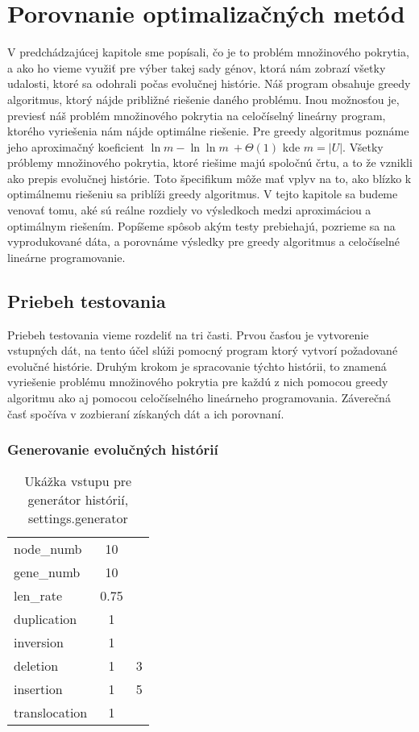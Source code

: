 \chapter{Porovnanie optimalizačných metód}
V predchádzajúcej kapitole sme popísali, čo je to problém množinového pokrytia, a
ako ho vieme využiť pre výber takej sady génov, ktorá nám zobrazí všetky udalosti, ktoré sa odohrali počas evolučnej histórie.
Náš program obsahuje greedy algoritmus, ktorý nájde približné riešenie daného problému.
Inou možnosťou je, previesť náš problém množinového pokrytia na celočíselný lineárny program, ktorého vyriešenia nám nájde optimálne riešenie.
Pre greedy algoritmus poznáme jeho aproximačný koeficient \(\ln m - \ln \ln m\ +\Theta(1) \) \cite{Slavik} 
kde \(m = |U|\). 
Všetky próblemy množinového pokrytia, ktoré riešime majú spoločnú črtu, a to že vznikli ako prepis evolučnej histórie.
Toto špecifikum môže mať vplyv na to, ako blízko k optimálnemu riešeniu sa priblíži greedy algoritmus.
V tejto kapitole sa budeme venovať tomu, aké sú reálne rozdiely vo výsledkoch medzi aproximáciou a optimálnym riešením.
Popíšeme spôsob akým testy prebiehajú, pozrieme sa na vyprodukované dáta, a porovnáme výsledky pre greedy algoritmus a celočíselné lineárne programovanie.

\section{Priebeh testovania}
Priebeh testovania vieme rozdeliť na tri časti. 
Prvou časťou je vytvorenie vstupných dát, na tento účel slúži pomocný program ktorý vytvorí požadované evolučné histórie.
Druhým krokom je spracovanie týchto histórii, to znamená vyriešenie problému množinového pokrytia pre každú z nich pomocou 
greedy algoritmu ako aj pomocou celočíselného lineárneho programovania. Záverečná časť spočíva v zozbieraní získaných dát a ich porovnaní.
\subsection{Generovanie evolučných histórií}
\label{sub:generovanie}

\begin{table}[!htb]
\label{tab:generator}
\begin{center}
\begin{tabular}{lcl}
node\_numb & 10 & \\
gene\_numb & 10 & \\
len\_rate & 0.75 & \\
duplication & 1 & \\ 
inversion & 1 & \\ 
deletion & 1 & 3 \\ 
insertion & 1 & 5 \\ 
translocation & 1 & \\
\end{tabular}
\end{center}
\caption{Ukážka vstupu pre generátor histórií, settings.generator}
\end{table}

